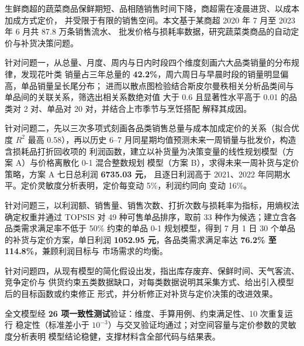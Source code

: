 
生鲜商超的蔬菜商品保鲜期短、品相随销售时间下降，商超需在凌晨进货、以成本加成方式定价，
并受限于有限的销售空间。本文基于某商超 2020 年 7 月至 2023 年 6 月共 87.8 万条销售流水、
批发价格与损耗率数据，研究蔬菜类商品的自动定价与补货决策问题。

针对问题一，从总量、月度、周内与日内时段四个维度刻画六大品类销量的分布规律，发现花叶类
销量占三年总量的 \textbf{42.2\%}，周六周日与早晨时段的销量明显偏高，单品销量呈长尾分布；
进而以散点图检验结合斯皮尔曼秩相关分析品类间与单品间的关联关系，筛选出相关系数绝对值
大于 0.6 且显著性水平高于 0.01 的品类对 2 对、单品对 20 对，并结合上市季节与烹饪搭配
解释其成因。

针对问题二，先以三次多项式刻画各品类销售总量与成本加成定价的关系（拟合优度 $R^2$ 最高
0.58），再以历史 6--7 月同星期均值预测未来一周销量与批发价，构造含损耗品打折回收项的
利润函数，建立以补货量为决策变量的线性规划模型（方案 A）与价格离散化 0-1 混合整数规划
模型（方案 B），求得未来一周补货与定价策略，方案 A 七日总利润 \textbf{6735.03 元}，
且逐日利润高于 2021、2022 年同期水平。定价灵敏度分析表明，定价每变动 5\%，利润约同向
变动 16\%。

针对问题三，以利润额、销售量、销售次数、打折次数与损耗率为指标，用熵权法确定权重并通过
TOPSIS 对 49 种可售单品排序，取前 33 种作为候选；建立含各品类需求满足率不低于 50\%
约束的单品 0-1 规划模型，得到 7 月 1 日 30 个单品的补货与定价方案，单日利润
\textbf{1052.95 元}，各品类需求满足率达 \textbf{76.2\% 至 114.8\%}，兼顾利润目标与
市场需求的均衡。

针对问题四，从现有模型的简化假设出发，指出库存废弃、保鲜时间、天气客流、竞争定价与
供货约束五类数据缺口，对每类数据说明其采集方式、给出引入模型后的目标函数或约束修正
形式，并分析修正对补货与定价决策的改进效果。

全文模型经 \textbf{26 项一致性测试}验证：维度、手算用例、约束满足性、10 次重复运行
稳定性（标准差小于 $10^{-3}$）与交叉验证均通过；对空间容量与定价参数的灵敏度分析表明
模型结论稳健，支撑材料含全部代码与结果表。
